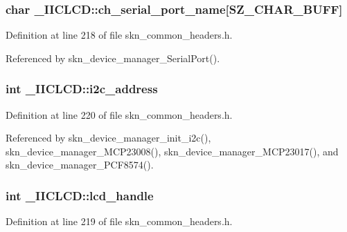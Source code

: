 \subsubsection[{\texorpdfstring{ch\+\_\+serial\+\_\+port\+\_\+name}{ch_serial_port_name}}]{\setlength{\rightskip}{0pt plus 5cm}char \+\_\+\+I\+I\+C\+L\+C\+D\+::ch\+\_\+serial\+\_\+port\+\_\+name\mbox{[}{\bf S\+Z\+\_\+\+C\+H\+A\+R\+\_\+\+B\+U\+FF}\mbox{]}}\hypertarget{struct___i_i_c_l_c_d_a2f193b0806fdbba1d644567835e2b2e8}{}\label{struct___i_i_c_l_c_d_a2f193b0806fdbba1d644567835e2b2e8}


Definition at line 218 of file skn\+\_\+common\+\_\+headers.\+h.



Referenced by skn\+\_\+device\+\_\+manager\+\_\+\+Serial\+Port().

\subsubsection[{\texorpdfstring{i2c\+\_\+address}{i2c_address}}]{\setlength{\rightskip}{0pt plus 5cm}int \+\_\+\+I\+I\+C\+L\+C\+D\+::i2c\+\_\+address}\hypertarget{struct___i_i_c_l_c_d_a3f3fe8757875939b987ac0c416081551}{}\label{struct___i_i_c_l_c_d_a3f3fe8757875939b987ac0c416081551}


Definition at line 220 of file skn\+\_\+common\+\_\+headers.\+h.



Referenced by skn\+\_\+device\+\_\+manager\+\_\+init\+\_\+i2c(), skn\+\_\+device\+\_\+manager\+\_\+\+M\+C\+P23008(), skn\+\_\+device\+\_\+manager\+\_\+\+M\+C\+P23017(), and skn\+\_\+device\+\_\+manager\+\_\+\+P\+C\+F8574().

\subsubsection[{\texorpdfstring{lcd\+\_\+handle}{lcd_handle}}]{\setlength{\rightskip}{0pt plus 5cm}int \+\_\+\+I\+I\+C\+L\+C\+D\+::lcd\+\_\+handle}\hypertarget{struct___i_i_c_l_c_d_afc74b2d9120be4a8e69e48b220d6781c}{}\label{struct___i_i_c_l_c_d_afc74b2d9120be4a8e69e48b220d6781c}


Definition at line 219 of file skn\+\_\+common\+\_\+headers.\+h.



